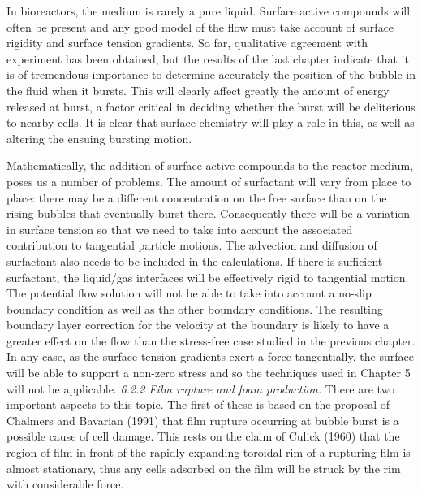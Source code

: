 In bioreactors, the medium is rarely a pure liquid.
Surface active compounds will often be present and
any good model of the flow must take account of surface 
rigidity and surface tension gradients. So far, qualitative agreement
with experiment has been obtained, but the results of 
the last chapter indicate that
it is of tremendous importance to determine accurately
the position of the bubble in the fluid when it bursts.
This will clearly affect greatly the
amount of energy released at burst, a factor critical
in deciding whether the burst will be deliterious to nearby cells.
It is clear that surface chemistry will play a role in
this, as well as altering the ensuing bursting motion.

Mathematically, the addition of surface active compounds to the reactor
medium, poses us a number of problems. The amount of surfactant
will vary from place to place:
there may be a different concentration on the free surface than on the 
rising bubbles that eventually burst there.
Consequently there will be a 
variation in surface tension so that we need to take into account the
associated contribution to tangential particle motions. 
The advection and diffusion of surfactant also needs to be included
in the calculations.
If there is sufficient surfactant, the liquid/gas interfaces will be effectively
rigid to tangential motion. 
The potential flow solution will not be able to take into account a 
no-slip boundary condition as well as the other boundary conditions.
The resulting boundary layer correction for the velocity at the boundary
is likely to have a greater effect on the flow 
than the stress-free case studied in the previous chapter.
In any case, as the surface tension gradients exert a force tangentially,
the surface will be able to support a non-zero stress and so
the techniques used in Chapter 5 will not be applicable.
\vskip 15pt
\c{\it 6.2.2 Film rupture and foam production.}
\vskip 5pt
There are two important aspects to this topic. The first of these is
based on the proposal of Chalmers and Bavarian (1991) that
film rupture occurring at bubble burst is a possible
cause of cell damage. This rests on the claim of Culick (1960) that 
the region of film in front of the rapidly expanding toroidal rim
of a rupturing film is almost stationary, thus any cells adsorbed on the
film will be struck by the rim with considerable force. 


